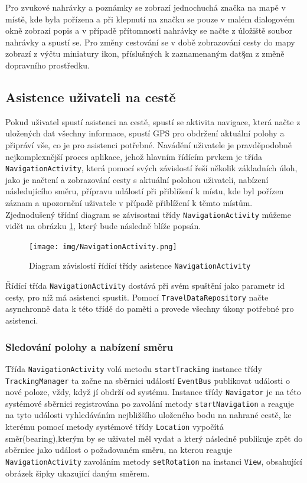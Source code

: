 \documentclass{article}
\begin{document}
Pro zvukové nahrávky a poznámky se zobrazí jednochuchá značka na mapě v místě, kde byla pořízena a při
klepnutí na značku se pouze v malém dialogovém okně zobrazí popis a v případě přítomnosti nahrávky
se načte z úložiště soubor nahrávky a spustí se. Pro změny cestování se v době zobrazování cesty do mapy
zobrazí z výčtu miniatury ikon, příslušných k zaznamenaným dat§m z změně dopravního prostředku.

\subsection{Asistence uživateli na cestě}
Pokud uživatel spustí asistenci na cestě, spustí se aktivita navigace, která načte z uložených
dat všechny informace, spustí GPS pro obdržení aktuální polohy a připráví vše, co je pro asistenci potřebné.
Navádění uživatele je pravděpodobně nejkomplexnější proces aplikace, jehož hlavním řídícím prvkem
je třída \texttt{NavigationActivity}, která
pomocí svých závislostí řeší několik základních úloh, jako je načtení a zobrazování cesty s aktuální polohou uživateli,
nabízení následujícího směru, přípravu událostí při přiblížení k místu, kde byl pořízen záznam a upozornění
uživatele v případě přiblížení k těmto místům. Zjednodušený třídní diagram se závisostmi třídy \texttt{NavigationActivity}
můžeme vidět na obrázku \ref{fig:navigationactivitydependencies}, který bude následně blíže popsán.

\begin{figure}[H]
        \centering
                \texttt{[image: img/NavigationActivity.png]}
        \caption{Diagram závislostí řídící třídy asistence \texttt{NavigationActivity}}
        \label{fig:navigationactivitydependencies}
\end{figure}

Řídící třída \texttt{NavigationActivity} dostává při svém spuštění jako parametr id cesty,
pro níž má asistenci spustit. Pomocí \texttt{TravelDataRepository} načte asynchronně data k této třídě
do paměti a provede všechny úkony potřebné pro asistenci.

\subsubsection{Sledování polohy a nabízení směru}
Třída \texttt{NavigationActivity} volá metodu \texttt{startTracking} instance třídy \texttt{TrackingManager}
ta začne na sběrnici událostí \texttt{EventBus} publikovat události o nové poloze, vždy, když jí
obdrží od systému.
Instance třídy \texttt{Navigator} je na této systémové sběrnici registrována po zavolání metody \texttt{startNavigation}
a reaguje na tyto události vyhledáváním nejbližšího uloženého bodu na nahrané cestě, ke kterému pomocí metody
systémové třídy \texttt{Location} vypočítá směr(bearing),kterým by se uživatel měl vydat a který následně publikuje zpět do sběrnice
 jako událost o požadovaném směru, na kterou reaguje \texttt{NavigationActivity} zavoláním metody \texttt{setRotation}
 na instanci \texttt{View}, obsahující obrázek šipky ukazující daným směrem.
\end{document}
